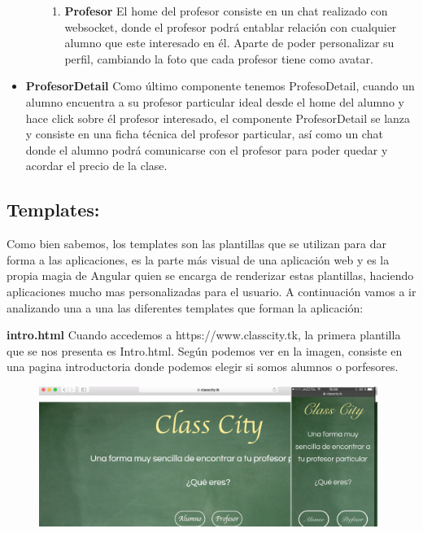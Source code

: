 \begin{itemize}
\begin{itemize}
\begin{enumerate}
\item \textbf{Profesor } El home del profesor consiste en un chat realizado con websocket, donde el profesor podrá entablar relación con cualquier alumno que este interesado en él. Aparte de poder personalizar su perfil, cambiando la foto que cada profesor tiene como avatar.
\end{enumerate}
\end{itemize}

\item \textbf{ProfesorDetail} Como último componente tenemos ProfesoDetail, cuando un alumno encuentra a su profesor particular ideal desde el home del alumno y hace click sobre él profesor interesado, el componente ProfesorDetail se lanza y consiste en una ficha técnica del profesor particular, así como un chat donde el alumno podrá comunicarse con el profesor para poder quedar y acordar el precio de la clase. 
 
\end{itemize}

\subsection{Templates: } Como bien sabemos, los templates son las plantillas que se utilizan para dar forma a las aplicaciones, es la parte más visual de una aplicación web y es la propia magia de Angular quien se encarga de renderizar estas plantillas, haciendo aplicaciones mucho mas personalizadas para el usuario. A continuación vamos a ir analizando una a una las diferentes templates que forman la aplicación:

\item \textbf{intro.html} Cuando accedemos a https://www.classcity.tk, la primera plantilla que se nos presenta es Intro.html. Según podemos ver en la imagen, consiste en una pagina introductoria donde podemos elegir si somos alumnos o porfesores.

\begin{figure}[H]
    \centering
    \includegraphics[width=110mm]{memoria/LaTeX/img/templates/intro.png}
\end{figure}

